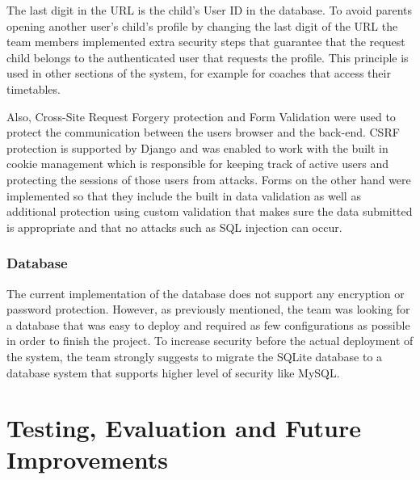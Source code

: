 \documentclass{l3proj}
\begin{document}
The last digit in the URL is the child’s User ID in the database. To avoid parents opening another user’s child's profile by changing the last digit of the URL the team members implemented extra security steps that guarantee that the request child belongs to the authenticated user that requests the profile. This principle is used in other sections of the system, for example for coaches that access their timetables.
\\
\par Also, Cross-Site Request Forgery protection and Form Validation were used to protect the communication between the users browser and the back-end. CSRF protection is supported by Django and was enabled to work with the built in cookie management which is responsible for keeping track of active users and protecting the sessions of those users from attacks. Forms on the other hand were implemented so that they include the built in data validation as well as additional protection using custom validation that makes sure the data submitted is appropriate and that no attacks such as SQL injection can occur.

\subsection{Database}
\par
The current implementation of the database does not support any encryption or password protection. However, as previously mentioned, the team was looking for a database that was easy to deploy and required as few configurations as possible in order to finish the project. To increase security before the actual deployment of the system, the team strongly suggests to migrate the SQLite database to a database system that supports higher level of security like MySQL.

\chapter{Testing, Evaluation and Future Improvements}
\label{testevfutimprv}

\end{document}
